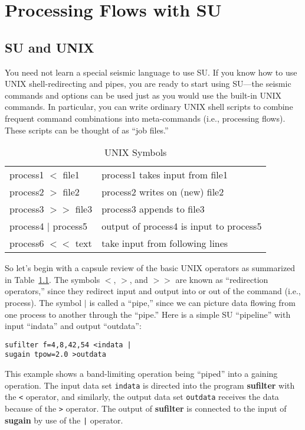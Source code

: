{{{{{{{\chapter{Processing Flows with SU}

\section{SU and UNIX}
You need not learn a special seismic language to use
{\small\sf SU}.  If you know how
to use UNIX shell-redirecting and pipes, you are ready to start
using {\small\sf SU}---the seismic commands and options can be used just as you
would use the built-in UNIX commands.  In particular, you
can write ordinary UNIX shell scripts to combine frequent
command combinations into meta-commands (i.e., processing flows).
These scripts can be thought of as ``job files.''

\begin{table}[htbp]
\label{SU:tab:unix}
\caption{UNIX Symbols}
\begin{tabular}{||l||l||}  \hline\hline
process1 $<$ file1 & process1 takes input from file1 \\
process2 $>$ file2 & process2 writes on (new) file2 \\
process3 $>>$ file3 & process3 appends to file3  \\
process4 $|$ process5 & output of process4 is input to process5  \\
process6 $<<$ text & take input from following lines  \\ \hline \hline
\end{tabular}
\end{table}

So let's begin with a capsule review of the basic UNIX operators
as summarized in Table~\ref{SU:tab:unix}.
The symbols $<$, $>$, and $>>$ are known as ``redirection operators,''
since they redirect input and output into or out of the command
(i.e., process).
The symbol $|$ is called a ``pipe,'' since we can picture
data flowing from one process to another through the ``pipe.''
Here is a simple {\small\sf SU} ``pipeline'' with input ``indata'' and
output ``outdata'':

{\small\begin{verbatim}
sufilter f=4,8,42,54 <indata |
sugain tpow=2.0 >outdata
\end{verbatim}}\noindent
This example shows a band-limiting operation being ``piped'' into
a gaining operation.  The input data set \verb:indata: is directed into
the program {\bf sufilter\/} with the \verb:<: operator, and similarly, the output data set \verb:outdata: receives the data because of the \verb:>: operator.
The output of {\bf sufilter\/} is connected to the input of {\bf sugain\/} by use of the \verb:|: operator.

}}}}}}}
